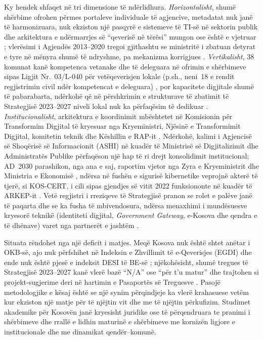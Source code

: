 \documentclass[conference]{IEEEtran}
\begin{document}
Ky hendek shfaqet në tri dimensione të ndërlidhura. \textit{Horizontalisht},
shumë shërbime ofrohen përmes portaleve individuale të agjencive, metadatat
nuk janë të harmonizuara, nuk ekziston një pasqyrë e sistemeve të TI-së në
sektorin publik dhe arkitektura e ndërmarrjes së ``qeverisë në tërësi''
mungon ose është e vjetruar \cite{strategjia2023}; vlerësimi i Agjendës
2013--2020 tregoi gjithashtu se ministritë i zbatuan detyrat e tyre në
mënyra shumë të ndryshme, pa mekanizma korrigjues \cite{agjenda2030}.
\textit{Vertikalisht}, 38 komunat kanë kompetenca vetanake dhe të deleguara
në ofrimin e shërbimeve sipas Ligjit Nr.~03/L-040 për vetëqeverisjen lokale
(p.sh., neni~18 e rendit regjistrimin civil ndër kompetencat e deleguara)
\cite{ligji03L040}, por kapacitete digjitale shumë të pabarabarta, ndërkohë
që në përshkrimin e strukturave të zbatimit të Strategjisë 2023--2027 niveli
lokal nuk ka përfaqësim të dedikuar \cite{strategjia2023}.
\textit{Institucionalisht}, arkitektura e koordinimit mbështetet në
Komisionin për Transformim Digjital të kryesuar nga Kryeministri, Njësinë e
Transformimit Digjital, komitetin teknik dhe Këshillin e RAP-it
\cite{strategjia2023}. Ndërkohë, kalimi i Agjencisë së Shoqërisë së
Informacionit (ASHI) në kuadër të Ministrisë së Digjitalizimit dhe
Administratës Publike përfaqëson një hap të ri drejt konsolidimit
institucional; AD~2030 parashikon, nga ana e saj, raportim vjetor nga Zyra e
Kryeministrit dhe Ministria e Ekonomisë \cite{agjenda2030}, ndërsa në fushën
e sigurisë kibernetike veprojnë akterë të tjerë, si KOS-CERT, i cili sipas
gjendjes së vitit 2022 funksiononte në kuadër të ARKEP-it \cite{kipred2022}.
Vetë regjistri i rreziqeve të Strategjisë pranon se rolet e palëve janë të
paqarta dhe se ka fusha të mbivendosura, ndërsa menaxhimi i mundësuesve
kryesorë teknikë (identiteti digjital, \textit{Government Gateway}, e-Kosova
dhe qendra e të dhënave) varet nga partnerët e jashtëm \cite{strategjia2023}.

Situata rëndohet nga një deficit i matjes. Meqë Kosova nuk është shtet
anëtar i OKB-së, ajo nuk përfshihet në Indeksin e Zhvillimit të
e-Qeverisjes (EGDI) \cite{undesa2024} dhe ende nuk është pjesë e indeksit
DESI të BE-së \cite{agjenda2030}; njëkohësisht, shumë tregues të Strategjisë
2023--2027 kanë vlerë bazë ``N/A'' ose ``për t'u matur'' dhe trajtohen si
projekt-sugjerime deri në hartimin e Pasaportës së Treguesve
\cite{strategjia2023}. Pasojë metodologjike e kësaj është se një synim
përqindjeje ka vlerë krahasuese vetëm kur ekziston një matje për të njëjtin
vit dhe me të njëjtin përkufizim. Studimet akademike për Kosovën janë
kryesisht juridike ose të përqendruara te pranimi i shërbimeve
\cite{dermaku2024,krasniqi2026} dhe rrallë e lidhin maturinë e shërbimeve me
kornizën ligjore e institucionale dhe me dinamikat qendër--komunë.
\end{document}
